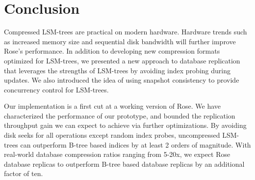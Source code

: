 \documentclass{vldb}
\newcommand{\rows}{Rose\xspace}
\newcommand{\rowss}{Rose's\xspace}
\newcommand{\xxx}[1]{\textcolor{red}{\bf XXX: #1}}
\renewcommand{\xxx}[1]{\xspace}
\begin{document}


\section{Conclusion}

Compressed LSM-trees are practical on modern hardware.  Hardware trends such as increased memory size and sequential disk bandwidth will further improve \rowss performance.  In addition
to developing new compression formats optimized for LSM-trees, we presented a new approach to
database replication that leverages the strengths of LSM-trees by
avoiding index probing during updates.  We also introduced the idea of
using snapshot consistency to provide concurrency control for
LSM-trees.


Our implementation is a first cut at a working version of \rows.
We have characterized the performance of our prototype, and
bounded the replication throughput gain we can expect to achieve via further
optimizations.  By avoiding disk seeks for all operations except
random index probes, uncompressed LSM-trees can outperform
B-tree based indices by at least 2 orders of magnitude.  With real-world
database compression ratios ranging from 5-20x, we expect \rows
database replicas to outperform B-tree based database replicas by an
additional factor of ten.

\xxx{new conclusion?}
\end{document}
